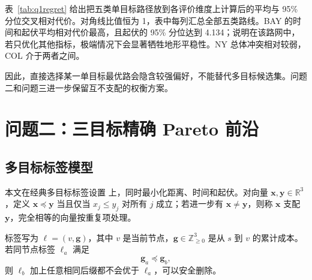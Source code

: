 \documentclass[UTF8,a4paper]{ctexart}
\begin{document}
表~\ref{tab:q1regret} 给出把五类单目标路径放到各评价维度上计算后的平均与 95\% 分位交叉相对代价。对角线比值恒为 1，表中每列汇总全部五类路线。BAY 的时间和起伏平均相对代价最高，且起伏的 95\% 分位达到 4.134；说明在该路网中，若只优化其他指标，极端情况下会显著牺牲地形平稳性。NY 总体冲突相对较弱，COL 介于两者之间。

\begin{table}[H]
\centering
\caption{问题一交叉相对代价统计}
\label{tab:q1regret}
\end{table}

因此，直接选择某一单目标最优路会隐含较强偏好，不能替代多目标候选集。问题二和问题三进一步保留互不支配的权衡方案。

\section{问题二：三目标精确 Pareto 前沿}

\subsection{多目标标签模型}

本文在经典多目标标签设置\cite{martins,namoadr} 上，同时最小化距离、时间和起伏。对向量 $\bm x,\bm y\in\mathbb{R}^3$，定义 $\bm x\preceq\bm y$ 当且仅当 $x_j\le y_j$ 对所有 $j$ 成立；若进一步有 $\bm x\ne\bm y$，则称 $\bm x$ 支配 $\bm y$\cite{pareto}，完全相等的向量按重复项处理。

标签写为 $\ell=(v,\bm g)$，其中 $v$ 是当前节点，$\bm g\in\mathbb{Z}_{\ge0}^3$ 是从 $s$ 到 $v$ 的累计成本。若同节点标签 $\ell_a$ 满足
\begin{equation}
\bm g_a\preceq\bm g_b,
\end{equation}
则 $\ell_b$ 加上任意相同后缀都不会优于 $\ell_a$，可以安全删除。
\end{document}
